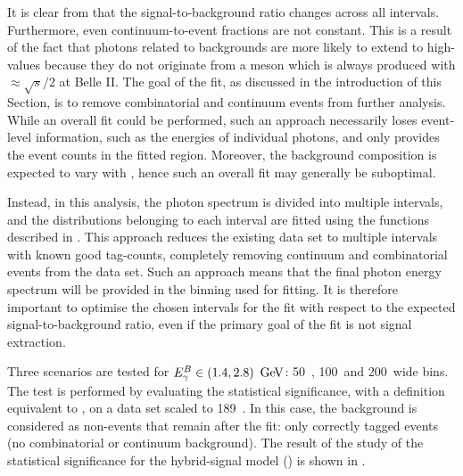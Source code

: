 It is clear from  that the signal-to-background ratio changes across all \EB intervals.
Furthermore, even continuum-to-\BB event fractions are not constant.
This is a result of the fact that photons related to \epem\ra\qqbar backgrounds are more likely to extend to high-\EB values because they do not originate from a \B meson which is always produced with $\approx\sqrt{s}/2$ at Belle II.
The goal of the fit, as discussed in the introduction of this Section, is to remove combinatorial \BB and continuum events from further analysis.
While an overall \Mbc fit could be performed, such an approach necessarily loses event-level information, such as the energies of individual photons, and only provides the event counts in the fitted \EB region.
Moreover, the background composition is expected to vary with \EB, hence such an overall fit may generally be suboptimal.

Instead, in this analysis, the photon spectrum is divided into multiple \EB intervals, and the \Mbc distributions belonging to each interval are fitted using the functions described in .
This approach reduces the existing data set to multiple \EB intervals with known good tag-\B counts, completely removing continuum and combinatorial \BB events from the data set.
Such an approach means that the final photon energy spectrum will be provided in the binning used for fitting.
It is therefore important to optimise the chosen intervals for the fit with respect to the expected \BtoXsgamma signal-to-background ratio, 
even if the primary goal of the fit is not signal extraction.

Three scenarios are tested for ${E^B_{\gamma}}\in(1.4,2.8)~\mathrm{\,Ge\kern -0.1em V}$: 50~\mev, 100~\mev and 200~\mev wide bins.
The test is performed by evaluating the statistical significance, with a definition equivalent to , on a data set scaled to 189~\invfb.
In this case, the background is considered as non-\BtoXsgamma events that remain after the \Mbc fit: only correctly tagged \BB events (no combinatorial or continuum background).
The result of the study of the statistical significance for the hybrid-signal model () is shown in .

